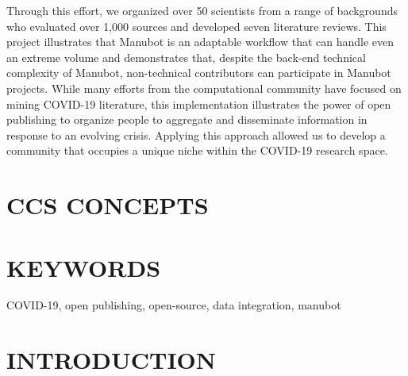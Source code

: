 \documentclass[twocolumn]{ceurart}
\begin{document}
Through this effort, we organized over 50 scientists from a range of backgrounds who evaluated over 1,000 sources and developed seven literature reviews.
This project illustrates that Manubot is an adaptable workflow that can handle even an extreme volume and demonstrates that, despite the back-end technical complexity of Manubot, non-technical contributors can participate in Manubot projects.
While many efforts from the computational community have focused on mining COVID-19 literature, this implementation illustrates the power of open publishing to organize people to aggregate and disseminate information in response to an evolving crisis.
Applying this approach allowed us to develop a community that occupies a unique niche within the COVID-19 research space.

\hypertarget{ccs-concepts}{%
\section{CCS CONCEPTS}\label{ccs-concepts}}

\hypertarget{keywords}{%
\section{KEYWORDS}\label{keywords}}

COVID-19, open publishing, open-source, data integration, manubot

\hypertarget{introduction}{%
\section{INTRODUCTION}\label{introduction}}
\end{document}
